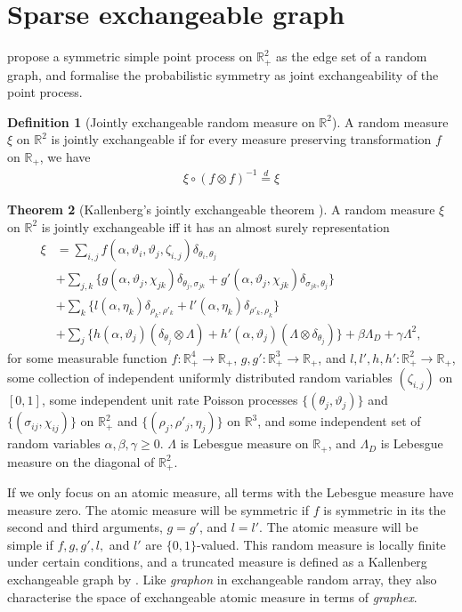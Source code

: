 \documentclass{article}
\theoremstyle{definition}
\newtheorem{definition}{Definition}
\newtheorem{theorem}[definition]{Theorem}
\begin{document}
\section{Sparse exchangeable graph}
\citet{Caron2015} propose a symmetric simple point process on $\mathbb{R}^2_+$ as the edge set of a random graph, and \citet{Veitch2015} formalise the probabilistic symmetry as joint exchangeability of the point process.
\begin{definition}[Jointly exchangeable random measure on $\mathbb{R}^2$] A random measure $\xi$ on $\mathbb{R}^2$ is jointly exchangeable if for every measure preserving transformation $f$ on $\mathbb{R}_+$, we have
\begin{align}
\xi \circ (f \otimes f)^{-1} \stackrel{d}{=} \xi
\end{align}
\end{definition}
\begin{theorem}[Kallenberg's jointly exchangeable theorem \citep{Kallenberg1990,kallenberg2005probabilistic}] A random measure $\xi$ on $\mathbb{R}^2$ is jointly exchangeable iff it has an almost surely representation
\begin{align}
\xi &= \sum_{i,j} f(\alpha, \vartheta_i, \vartheta_j, \zeta_{i,j})\delta_{\theta_i, \theta_j} \label{kallenjoint}\\
&+ \sum_{j,k}\{g(\alpha, \vartheta_j, \chi_{jk})\delta_{\theta_j,\sigma_{jk}} + g'(\alpha, \vartheta_j, \chi_{jk})\delta_{\sigma_{jk},\theta_j}\}\\
&+ \sum_{k}\{l(\alpha, \eta_k)\delta_{\rho_k,\rho'_k} + l'(\alpha, \eta_k)\delta_{\rho'_k, \rho_k}\}\\
&+\sum_j\{h(\alpha, \vartheta_j)(\delta_{\theta_j} \otimes \Lambda) + h'(\alpha, \vartheta_j)(\Lambda \otimes \delta_{\theta_j})\} + \beta\Lambda_D + \gamma \Lambda^2,
\end{align}
for some measurable function $f:\mathbb{R}_+^4 \rightarrow \mathbb{R}_+$, $g,g':\mathbb{R}_+^3 \rightarrow \mathbb{R}_+$, and $l, l', h, h': \mathbb{R}_+^2\rightarrow\mathbb{R}_+$, some collection of independent uniformly distributed random variables $(\zeta_{i,j})$ on $[0,1]$, some independent unit rate Poisson processes $\{(\theta_j, \vartheta_j)\}$ and $\{(\sigma_{ij}, \chi_{ij})\}$ on $\mathbb{R}_+^2$ and $\{(\rho_j, \rho'_j, \eta_j)\}$ on $\mathbb{R}^3$, and some independent set of random variables $\alpha, \beta, \gamma \geq 0$. $\Lambda$ is Lebesgue measure on $\mathbb{R}_+$, and $\Lambda_D$ is Lebesgue measure on the diagonal of $\mathbb{R}_+^2$.
\end{theorem}
If we only focus on an atomic measure, all terms with the Lebesgue measure have measure zero. The atomic measure will be symmetric if $f$ is symmetric in its the second and third arguments, $g = g'$, and $l=l'$. The atomic measure will be simple if $f, g, g', l,$ and $l'$ are $\{0,1\}$-valued. This random measure is locally finite under certain conditions, and a truncated measure is defined as a Kallenberg exchangeable graph by \cite{Veitch2015}. Like \textit{graphon} in exchangeable random array, they also characterise the space of exchangeable atomic measure in terms of \textit{graphex}.
\end{document}
